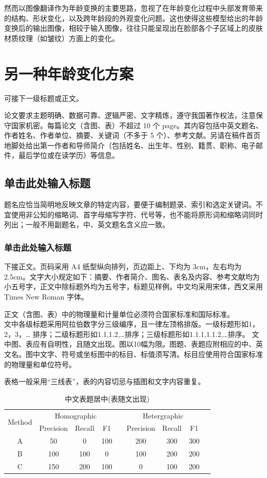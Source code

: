\documentclass[12pt,a4paper]{article}
\begin{document}
然而以图像翻译作为年龄变换的主要思路，忽视了在年龄变化过程中头部发育带来的结构、形状变化，以及跨年龄段的外观变化问题。这也使得这些模型给出的年龄变换后的输出图像，相较于输入图像，往往只能呈现出在脸部各个子区域上的皮肤材质纹理（如皱纹）方面上的变化。


\section{另一种年龄变化方案}
可接下一级标题或正文。


论文要求主题明确、数据可靠、逻辑严密、文字精炼，遵守我国著作权法，注意保守国家机密。每篇论文（含图、表）不超过 10 个 page。其内容包括中英文题名、作者姓名、作者单位、摘要、关键词（不多于 5 个）、参考文献。另请在稿件首页地脚处给出第一作者和导师简介（包括姓名、出生年、性别、籍贯、职称、电子邮件，最后学位或在读学历）等信息。

\subsection{单击此处输入标题}
题名应恰当简明地反映文章的特定内容，要便于编制题录、索引和选定关键词。不宜使用非公知的缩略词、首字母缩写字符、代号等，也不能将原形词和缩略词同时列出；一般不用副题名，中、英文题名含义应一致。
\subsubsection{单击此处输入标题}
下接正文。页码采用 A4 纸型纵向排列，页边距上、下均为 3cm，左右均为 2.5cm。文字大小规定如下：摘要、作者简介、图名、表名及内容、参考文献均为小五号字，正文中除标题外均为五号字，标题见样例。中文均采用宋体，西文采用 Times New Roman 字体。


正文（含图、表）中的物理量和计量单位必须符合国家标准和国际标准。 \\
文中各级标题采用阿拉伯数字分三级编序，且一律左顶格排版。一级标题形如1，2，3，… 排序；二级标题形如1.1,1.2,…排序；三级标题形如1.1.1,1.1.2,…排序。
文中图、表应有自明性，且随文出现。图以10幅为限。图题、表题应附相应的中、英文名。图中文字、符号或坐标图中的标目、标值须写清。标目应使用符合国家标准的物理量和单位符号。


表格一般采用“三线表”，表的内容切忌与插图和文字内容重复。

\begin{table}[H]\footnotesize
\centering
\caption{中文表题居中(表随文出现)}
\begin{tabular}{ccccccccccc} %
\toprule %
\multicolumn{3}{c}{\multirow{2}{*}{Method}}& \multicolumn{3}{c}{Homographic}& &\multicolumn{3}{c}{Hetergraphic}\\
\multicolumn{3}{c}{}&Precision&Recall&F1&&Precision&Recall&F1&\\  %
\hline %
\multicolumn{3}{c}{A}& 50& 0& 100& &200& 300& 300\\   %
\multicolumn{3}{c}{B}&100&100&0& &100&200&200\\
\multicolumn{3}{c}{C}&150&200&100& &0&100&200\\
\bottomrule %
\end{tabular}
\end{table}
\end{document}
